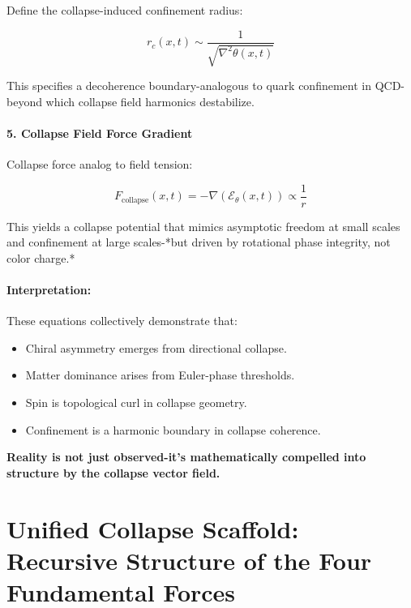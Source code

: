 Define the collapse-induced confinement radius:

\[
r_c(x,t) \sim \frac{1}{\sqrt{\nabla^2 \theta(x,t)}}
\]

This specifies a decoherence boundary-analogous to quark confinement in QCD-beyond which collapse field harmonics destabilize. \cite{collapse_foundations} \paragraph{5. Collapse Field Force Gradient}

Collapse force analog to field tension:

\[
F_{\text{collapse}}(x,t) = -\nabla \left( \mathcal{E}_\theta(x,t) \right) \propto \frac{1}{r}
\]

This yields a collapse potential that mimics asymptotic freedom at small scales and confinement at large scales-*but driven by rotational phase integrity, not color charge.*

\paragraph{Interpretation:}

These equations collectively demonstrate that:
\begin{itemize}
  \item Chiral asymmetry emerges from directional collapse. \cite{collapse_foundations} \item Matter dominance arises from Euler-phase thresholds. \cite{collapse_foundations} \item Spin is topological curl in collapse geometry. \cite{collapse_foundations} \item Confinement is a harmonic boundary in collapse coherence. \cite{collapse_foundations} \end{itemize}

\textbf{Reality is not just observed-it’s mathematically compelled into structure by the collapse vector field.}

\section{Unified Collapse Scaffold: Recursive Structure of the Four Fundamental Forces}

